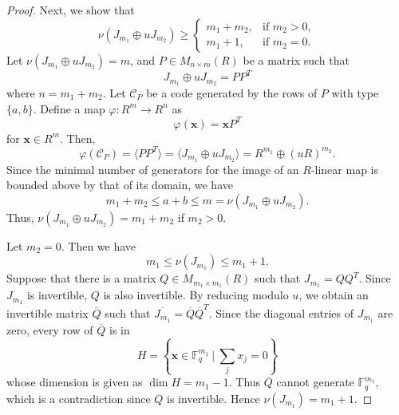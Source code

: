 \documentclass[10pt,a4paper]{amsart}
\begin{document}
\begin{proof}
Next, we show that
\[
\nu(J_{m_1}\oplus uJ_{m_2})\ge \begin{cases}
        m_1+m_2, & \mbox{if }m_2>0,\\
        m_1+1, & \mbox{if }m_2=0.
    \end{cases}
\]
Let $\nu(J_{m_1}\oplus uJ_{m_2})=m$, and $P\in M_{n\times m}(R)$ be a matrix such that
\[
J_{m_1}\oplus uJ_{m_2}=PP^T
\]
where $n=m_1+m_2$. Let $\mathcal{C}_P$ be a code generated by the rows of $P$ with type $\{a, b\}$. Define a map $\varphi:R^{m}\to R^n$ as
\[
\varphi(\mathbf{x})=\mathbf{x}P^T
\]
for $\mathbf{x}\in R^m$. Then,
\[
\varphi(\mathcal{C}_P)=\langle PP^T\rangle=\langle J_{m_1}\oplus uJ_{m_2}\rangle=R^{m_1}\oplus (uR)^{m_2}.
\]
Since the minimal number of generators for the image of an $R$-linear map is bounded above by that of its domain, we have
\[
m_1+m_2\le a+b\le m=\nu(J_{m_1}\oplus uJ_{m_2}).
\]
Thus, $\nu(J_{m_1}\oplus uJ_{m_2})=m_1+m_2$ if $m_2>0$.

Let $m_2=0$. Then we have
\[
m_1\le \nu(J_{m_1})\le m_1+1.
\]
Suppose that there is a matrix $Q\in M_{m_1\times m_1}(R)$ such that $J_{m_1}=QQ^T$. Since $J_{m_1}$ is invertible, $Q$ is also invertible. By reducing modulo $u$, we obtain an invertible matrix $\overline{Q}$ such that $\overline{J_{m_1}}=\overline{Q}\overline{Q}^T$. Since the diagonal entries of $J_{m_1}$ are zero, every row of $\overline{Q}$ is in
\[
H=\left\{\mathbf{x}\in \mathbb{F}_q^{m_1}~|~\sum_jx_j=0\right\}
\]
whose dimension is given as $\dim H=m_1-1$. Thus $\overline{Q}$ cannot generate $\mathbb{F}_q^{m_1}$, which is a contradiction since $Q$ is invertible. Hence $\nu(J_{m_1})=m_1+1$.
\end{proof}
\end{document}
